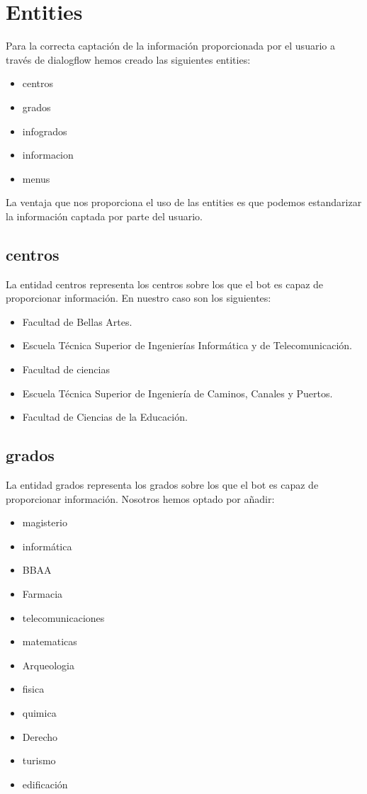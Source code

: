 \section{Entities}

Para la correcta captación de la información proporcionada por el usuario a través de dialogflow hemos creado las siguientes entities:
\begin{itemize}
	\item centros
	\item grados
	\item infogrados
	\item informacion
	\item menus
\end{itemize}

La ventaja que nos proporciona el uso de las entities es que podemos estandarizar la información captada por parte del usuario.

\subsection{centros}
La entidad centros representa los centros sobre los que el bot es capaz de proporcionar información. En nuestro caso son los siguientes:

\begin{itemize}
	\item Facultad de Bellas Artes.
	\item Escuela Técnica Superior de Ingenierías Informática y de Telecomunicación.
	\item Facultad de ciencias
	\item Escuela Técnica Superior de Ingeniería de Caminos, Canales y Puertos.
	\item Facultad de Ciencias de la Educación.
\end{itemize}

\subsection{grados}
La entidad grados representa los grados sobre los que el bot es capaz de proporcionar información. Nosotros hemos optado por añadir:

\begin{itemize}
	\item magisterio
	\item informática
	\item BBAA
	\item Farmacia
	\item telecomunicaciones
	\item matematicas
	\item Arqueologia
	\item fisica
	\item quimica
	\item Derecho
	\item turismo
	\item edificación
\end{itemize}

